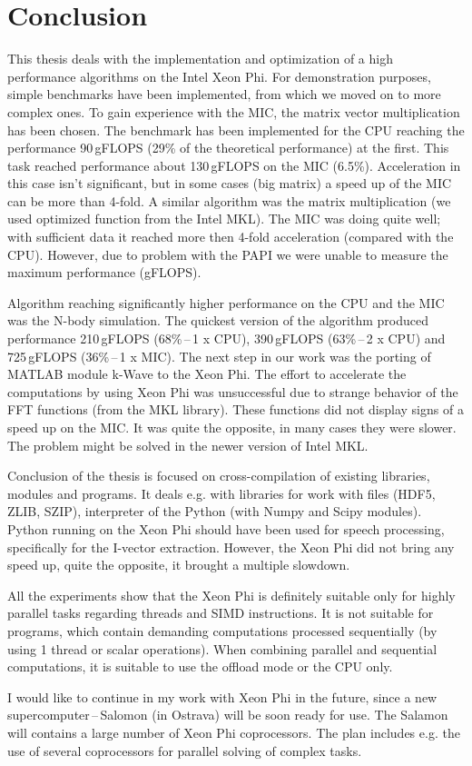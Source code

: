 \chapter{Conclusion}
This thesis deals with the implementation and optimization of a high performance algorithms on the Intel Xeon Phi. For demonstration purposes, simple benchmarks have been implemented, from which we moved on to more complex ones. To gain experience with the MIC, the matrix vector multiplication has been chosen. The benchmark has been implemented for the CPU reaching the performance 90\,gFLOPS (29\% of the theoretical performance) at the first. This task reached performance about 130\,gFLOPS on the MIC (6.5\%). Acceleration in this case isn't significant, but in some cases (big matrix) a speed up of the MIC can be more than 4-fold. A similar algorithm was the matrix multiplication (we used optimized function from the Intel MKL). The MIC was doing quite well; with sufficient data it reached more then 4-fold acceleration (compared with the CPU). However, due to problem with the PAPI we were unable to measure the maximum performance (gFLOPS).

\par Algorithm reaching significantly higher performance on the CPU and the MIC was the N-body simulation. The quickest version of the algorithm produced performance 210\,gFLOPS (68\%\,--\,1 x CPU), 390\,gFLOPS (63\%\,--\,2 x CPU) and 725\,gFLOPS (36\%\,--\,1 x MIC).
The next step in our work was the porting of MATLAB module k-Wave to the Xeon Phi. The effort to accelerate the computations by using Xeon Phi was unsuccessful due to strange behavior of the FFT functions (from the MKL library). These functions did not display signs of a speed up on the MIC. It was quite the opposite, in many cases they were slower. The problem might be solved in the newer version of Intel MKL.

\par Conclusion of the thesis is focused on cross-compilation of existing libraries, modules and programs. It deals e.g. with libraries for work with files (HDF5, ZLIB, SZIP), interpreter of the Python (with Numpy and Scipy modules). Python running on the Xeon Phi should have been used for speech processing, specifically for the I-vector extraction. However, the Xeon Phi did not bring any speed up, quite the opposite, it brought a multiple slowdown.

\par All the experiments show that the Xeon Phi is definitely suitable only for highly parallel tasks regarding threads and SIMD instructions. It is not suitable for programs, which contain demanding computations processed sequentially (by using 1 thread or scalar operations). When combining parallel and sequential computations, it is suitable to use the offload mode or the CPU only.

\par I would like to continue in my work with Xeon Phi in the future, since a new supercomputer\,--\,Salomon (in Ostrava) will be soon ready for use. The Salamon will contains a large number of Xeon Phi coprocessors. The plan includes e.g. the use of several coprocessors for parallel solving of complex tasks.
